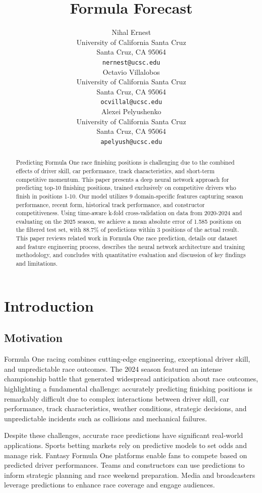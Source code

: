 \documentclass{article}
\title{Formula Forecast}
\author{%
  Nihal Ernest \\
  University of California Santa Cruz\\
  Santa Cruz, CA 95064 \\
  \texttt{nernest@ucsc.edu} \\
  \And
  Octavio Villalobos\\
  University of California Santa Cruz\\
  Santa Cruz, CA 95064 \\
  \texttt{ocvillal@ucsc.edu} \\
  \AND
  Alexei Pelyushenko\\
  University of California Santa Cruz\\
  Santa Cruz, CA 95064 \\
  \texttt{apelyush@ucsc.edu} \\
}
\begin{document}
\maketitle


\begin{abstract}
Predicting Formula One race finishing positions is challenging due to the combined effects of driver skill, car performance, track characteristics, and short-term competitive momentum. This paper presents a deep neural network approach for predicting top-10 finishing positions, trained exclusively on competitive drivers who finish in positions 1-10. Our model utilizes 9 domain-specific features capturing season performance, recent form, historical track performance, and constructor competitiveness. Using time-aware k-fold cross-validation on data from 2020-2024 and evaluating on the 2025 season, we achieve a mean absolute error of 1.585 positions on the filtered test set, with 88.7\% of predictions within 3 positions of the actual result. This paper reviews related work in Formula One race prediction, details our dataset and feature engineering process, describes the neural network architecture and training methodology, and concludes with quantitative evaluation and discussion of key findings and limitations.
\end{abstract} 


\section{Introduction}

\subsection{Motivation}

Formula One racing combines cutting-edge engineering, exceptional driver skill, and unpredictable race outcomes. The 2024 season featured an intense championship battle that generated widespread anticipation about race outcomes, highlighting a fundamental challenge: accurately predicting finishing positions is remarkably difficult due to complex interactions between driver skill, car performance, track characteristics, weather conditions, strategic decisions, and unpredictable incidents such as collisions and mechanical failures.

Despite these challenges, accurate race predictions have significant real-world applications. Sports betting markets rely on predictive models to set odds and manage risk. Fantasy Formula One platforms enable fans to compete based on predicted driver performances. Teams and constructors can use predictions to inform strategic planning and race weekend preparation. Media and broadcasters leverage predictions to enhance race coverage and engage audiences.
\end{document}
